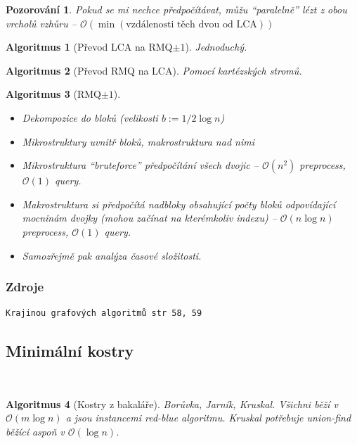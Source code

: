 \documentclass{article}
\theoremstyle{noparens}
\newtheorem*{alg}{Algoritmus}
\newtheorem*{pozor}{Pozorování}
\theoremstyle{noparens-mys}
\theoremstyle{noparens-note}
\newcommand{\OO}{\mathcal{O}}
\begin{document}
\begin{pozor}
Pokud se mi nechce předpočítávat, můžu \enquote{paralelně} lézt z obou vrcholů
vzhůru -- $\OO(\min(\text{vzdálenosti těch dvou od LCA}))$
\end{pozor}

\begin{alg}[Převod LCA na RMQ$\pm1$]
    Jednoduchý.
\end{alg}

\begin{alg}[Převod RMQ na LCA]
    Pomocí kartézských stromů.
\end{alg}

\begin{alg}[RMQ$\pm1$]
    ~

    \begin{itemize}
        \item Dekompozice do bloků (velikosti $b := 1/2 \log n$)
        \item Mikrostruktury uvnitř bloků, makrostruktura nad nimi
        \item Mikrostruktura \enquote{bruteforce} předpočítání všech dvojic --
            $\OO(n^2)$ preprocess, $\OO(1)$ query.
        \item Makrostruktura si předpočítá nadbloky obsahující počty bloků
            odpovídající mocninám dvojky (mohou začínat na kterémkoliv indexu)
            -- $\OO(n \log n)$ preprocess, $\OO(1)$ query.
        \item Samozřejmě pak analýza časové složitosti.
    \end{itemize}
\end{alg}

\subsubsection*{Zdroje}

\begin{verbatim}
Krajinou grafových algoritmů str 58, 59
\end{verbatim}


\subsection{Minimální kostry}

~

\begin{alg}[Kostry z bakaláře]
Borůvka, Jarník, Kruskal. Všichni běží v $\OO(m \log n)$ a jsou instancemi
red-blue algoritmu.  Kruskal potřebuje union-find běžící aspoň v $\OO(\log n)$.
\end{alg}
\end{document}
